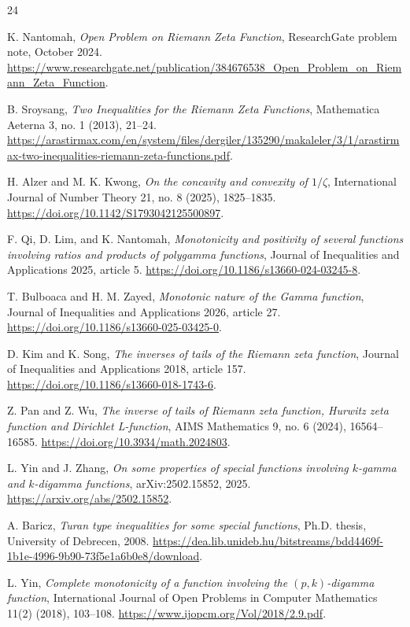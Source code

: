 \documentclass[11pt]{article}
\numberwithin{equation}{section}
\theoremstyle{definition}
\theoremstyle{remark}
\newcommand{\1}{\mathbf 1}
\begin{document}
\begin{thebibliography}{24}

K. Nantomah,
\emph{Open Problem on Riemann Zeta Function},
ResearchGate problem note, October 2024.
\url{https://www.researchgate.net/publication/384676538_Open_Problem_on_Riemann_Zeta_Function}.

B. Sroysang,
\emph{Two Inequalities for the Riemann Zeta Functions},
Mathematica Aeterna 3, no. 1 (2013), 21--24.
\url{https://arastirmax.com/en/system/files/dergiler/135290/makaleler/3/1/arastirmax-two-inequalities-riemann-zeta-functions.pdf}.

H. Alzer and M. K. Kwong,
\emph{On the concavity and convexity of \(1/\zeta\)},
International Journal of Number Theory 21, no. 8 (2025), 1825--1835.
\url{https://doi.org/10.1142/S1793042125500897}.

F. Qi, D. Lim, and K. Nantomah,
\emph{Monotonicity and positivity of several functions involving ratios and products of polygamma functions},
Journal of Inequalities and Applications 2025, article 5.
\url{https://doi.org/10.1186/s13660-024-03245-8}.

T. Bulboaca and H. M. Zayed,
\emph{Monotonic nature of the Gamma function},
Journal of Inequalities and Applications 2026, article 27.
\url{https://doi.org/10.1186/s13660-025-03425-0}.

D. Kim and K. Song,
\emph{The inverses of tails of the Riemann zeta function},
Journal of Inequalities and Applications 2018, article 157.
\url{https://doi.org/10.1186/s13660-018-1743-6}.

Z. Pan and Z. Wu,
\emph{The inverse of tails of Riemann zeta function, Hurwitz zeta function and Dirichlet L-function},
AIMS Mathematics 9, no. 6 (2024), 16564--16585.
\url{https://doi.org/10.3934/math.2024803}.


L. Yin and J. Zhang,
\emph{On some properties of special functions involving \(k\)-gamma and \(k\)-digamma functions},
arXiv:2502.15852, 2025.
\url{https://arxiv.org/abs/2502.15852}.


A. Baricz,
\emph{Turan type inequalities for some special functions},
Ph.D. thesis, University of Debrecen, 2008.
\url{https://dea.lib.unideb.hu/bitstreams/bdd4469f-1b1e-4996-9b90-73f5e1a6b0e8/download}.

L. Yin,
\emph{Complete monotonicity of a function involving the \((p,k)\)-digamma function},
International Journal of Open Problems in Computer Mathematics 11(2) (2018), 103--108.
\url{https://www.ijopcm.org/Vol/2018/2.9.pdf}.


\end{thebibliography}
\end{document}
